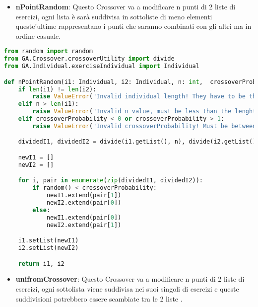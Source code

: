 \documentclass{article}
\begin{document}
\pagebreak

\begin{itemize}
\item\textbf{nPointRandom}: Questo Crossover va a modificare n punti di 2 liste di esercizi, ogni lista è sarà suddivisa in sottoliste di meno elementi queste'ultime rappresentano i punti che saranno combinati con gli altri ma in ordine casuale.
\end{itemize}

\begin{lstlisting}[language=Python, breaklines, no caption]
from random import random
from GA.Crossover.crossoverUtility import divide
from GA.Individual.exerciseIndividual import Individual

def nPointRandom(i1: Individual, i2: Individual, n: int,  crossoverProbability: float) -> tuple[Individual, Individual]:
    if len(i1) != len(i2):
        raise ValueError("Invalid individual length! They have to be the same.")
    elif n > len(i1):
        raise ValueError("Invalid n value, must be less than the lenght of the individual!")
    elif crossoverProbability < 0 or crossoverProbability > 1:
        raise ValueError("Invalid crossoverProbability! Must be between 0 and 1")

    dividedI1, dividedI2 = divide(i1.getList(), n), divide(i2.getList(), n)

    newI1 = []
    newI2 = []

    for i, pair in enumerate(zip(dividedI1, dividedI2)):
        if random() < crossoverProbability:
            newI1.extend(pair[1])
            newI2.extend(pair[0])
        else:
            newI1.extend(pair[0])
            newI2.extend(pair[1])

    i1.setList(newI1)
    i2.setList(newI2)

    return i1, i2
\end{lstlisting}

\pagebreak

\begin{itemize}
\item\textbf{unifromCrossover}: Questo Crossover va a modificare n punti di 2 liste di esercizi, ogni sottolista viene suddivisa nei suoi singoli di esercizi e queste suddivisioni potrebbero essere scambiate tra le 2 liste .
\end{itemize}
\end{document}
